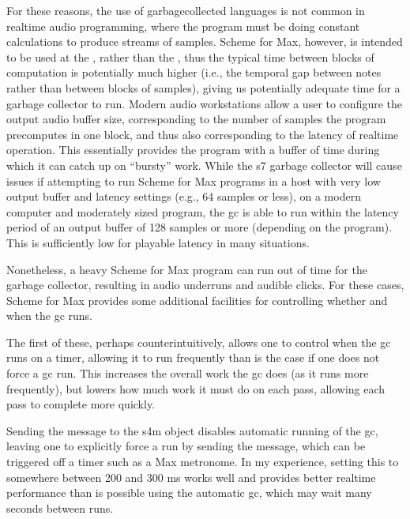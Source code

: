 \documentclass[letterpaper,10pt,english]{sphinxmanual}
\begin{document}
\sphinxAtStartPar
For these reasons, the use of garbage\sphinxhyphen{}collected languages is not common
in realtime audio programming, where the program must be doing constant calculations
to produce streams of samples.
Scheme for Max, however, is intended to be used at the ,
rather than the , thus the typical time between blocks of computation
is potentially much higher (i.e., the temporal gap between notes rather than between blocks of samples),
giving us potentially adequate time for a garbage collector to run.
Modern audio workstations allow a user to configure the output audio buffer size,
corresponding to the number of samples the program pre\sphinxhyphen{}computes in one block, and thus
also corresponding to the latency of realtime operation.
This essentially provides the program with a buffer of time during which it can catch up
on “bursty” work.
While the s7 garbage collector will cause issues if attempting to run
Scheme for Max programs in a host with very low output buffer and latency settings (e.g.,
64 samples or less), on a modern computer and moderately sized program,
the gc is able to run within the latency period of an output buffer of 128 samples
or more (depending on the program). This is sufficiently low for playable latency
in many situations.

\sphinxAtStartPar
Nonetheless, a heavy Scheme for Max program can run out of time for
the garbage collector, resulting in audio underruns and audible clicks.
For these cases, Scheme for Max provides some additional facilities
for controlling whether and when the gc runs.

\sphinxAtStartPar
The first of these, perhaps counterintuitively, allows one to control
when the gc runs on a timer, allowing it to run  frequently
than is the case if one does not force a gc run. This increases
the overall work the gc does (as it runs more frequently), but lowers
how much work it must do on each pass, allowing each pass to complete more quickly.

\sphinxAtStartPar
Sending the  message to the s4m object disables automatic
running of the gc, leaving one to explicitly force a run by sending
the  message, which can be triggered off a timer such as a
Max metronome. In my experience, setting this to somewhere between
200 and 300 ms works well and provides better realtime performance
than is possible using the automatic gc, which may wait many seconds between runs.
\end{document}
